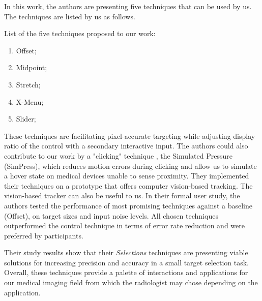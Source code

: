 In this work, the authors are presenting five techniques that can be used by us. The techniques are listed by us as follows.

\hfill

List of the five techniques proposed to our work:

\hfill

\begin{enumerate}
\item Offset;
\item Midpoint;
\item Stretch;
\item X-Menu;
\item Slider;
\end{enumerate}

\hfill

These techniques are facilitating pixel-accurate targeting while adjusting display ratio of the control with a secondary interactive input. The authors could also contribute to our work by a "clicking" technique , the Simulated Pressure (SimPress), which reduces motion errors during clicking and allow us to simulate a hover state on medical devices unable to sense proximity. They implemented their techniques on a prototype that offers computer vision-based tracking. The vision-based tracker can also be useful to us. In their formal user study, the authors tested the performance of most promising techniques against a baseline (Offset), on target sizes and input noise levels. All chosen techniques outperformed the control technique in terms of error rate reduction and were preferred by participants.

\clearpage

Their study results show that their \textit{Selections} techniques are presenting viable solutions for increasing precision and accuracy in a small target selection task. Overall, these techniques provide a palette of interactions and applications for our medical imaging field from which the radiologist may chose depending on the application.